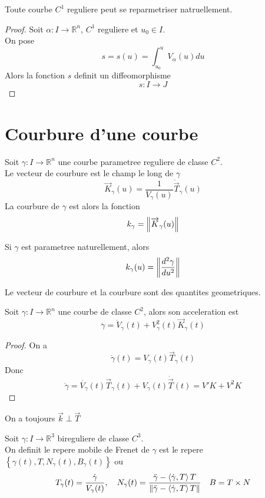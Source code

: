 \documentclass[../main.tex]{subfiles}
\begin{document}
\begin{propo}
Toute courbe $C^{1}$ reguliere peut se reparmetriser natruellement.
\end{propo}
\begin{proof}
Soit $\alpha: I \to \mathbb{R}^n$, $C^{1}$ reguliere et $u_0 \in I$.\\
On pose
\[ 
	s= s( u) = \int_{ u_0 }^{ u } V_{\alpha} ( u) du
\]
Alors la fonction $s$ definit un diffeomorphisme
\[ 
s: I \to J
\]


\end{proof}
\section{Courbure d'une courbe}
Soit $\gamma: I \to \mathbb{R}^n$ une courbe parametree reguliere de classe $C^{2}$.\\
Le vecteur de courbure est le champ le long de $\gamma$ 
\[ 
	\vec{K}_{\gamma} ( u)  = \frac{1}{V_{\gamma} ( u) } \dot{ \vec{T} }_{\gamma} ( u) 
\]
La courbure de $\gamma$ est alors la fonction
\[ 
	k_{\gamma} = \left\lVert  \overrightarrow{K}_{\gamma} ( u) \right\rVert 
\]
\begin{rmq}
Si $\gamma$ est parametree naturellement, alors
\[ 
	k_\gamma( u) = \left\lVert \frac{d^{2}\gamma}{du^{2}}\right\rVert 
\]

\end{rmq}
\begin{rmq}
Le vecteur de courbure et la courbure sont des quantites geometriques.
\end{rmq}
\begin{propo}  
Soit $\gamma: I \to \mathbb{R}^n$ une courbe de classe $C^{2}$, alors son acceleration est
\[ 
	\ddot { \gamma} = \dot { V} _\gamma( t) + V^{2}_\gamma( t) \vec{K}_{\gamma} ( t) 
\]

\end{propo}
\begin{proof}
On a 
\[ 
	\dot { \gamma} ( t) = V_{\gamma} ( t) \vec{T}_\gamma( t) 
\]
Donc
\[ 
	\ddot { \gamma} = \dot { V_{\gamma} } ( t) \vec{T}_\gamma( t) + V_\gamma( t) \dot { \vec{T}} ( t) = V' K + V^{2}K
\]


\end{proof}
\begin{rmq}
On a toujours $\vec{k}\perp \vec{T}$ 
\end{rmq}
\begin{defn}
	Soit $\gamma: I \to \mathbb{R}^3$ bireguliere de classe $C^{3}$.\\
	On definit le repere mobile de Frenet de $\gamma$ est le repere  $ \left\{ \gamma( t) , T, N_\gamma( t) , B_{\gamma} ( t)  \right\} $ ou 
	\[ 
		T_\gamma( t) = \frac{\dot \gamma}{V_{\gamma} ( t) }, \quad N_\gamma( t) = \frac{\ddot { \gamma} - \left\langle \dot \gamma, T\right\rangle T}{ \left\lVert \ddot { \gamma} - \left\langle \dot \gamma, T\right\rangle T\right\rVert }\quad B = T\times N
	\]
		
\end{defn}
\end{document}
